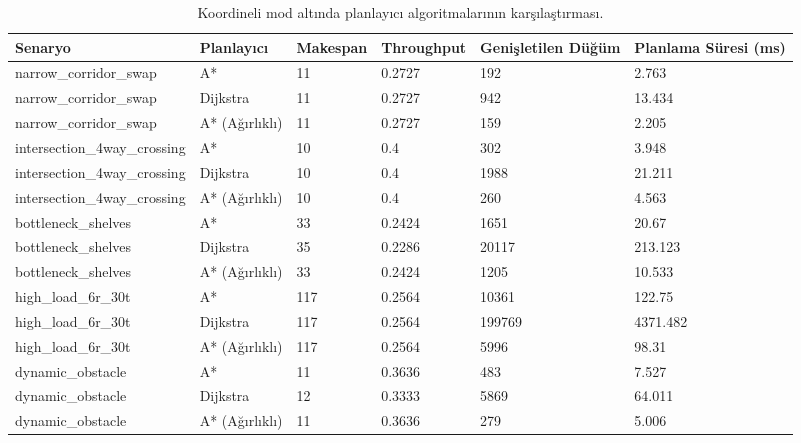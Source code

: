 \begin{table}[t]
\centering
\small
\begin{tabular}{llllll}
\hline
Senaryo & Planlayıcı & Makespan & Throughput & Genişletilen Düğüm & Planlama Süresi (ms) \\
\hline
narrow\_corridor\_swap & A* & 11 & 0.2727 & 192 & 2.763 \\
narrow\_corridor\_swap & Dijkstra & 11 & 0.2727 & 942 & 13.434 \\
narrow\_corridor\_swap & A* (Ağırlıklı) & 11 & 0.2727 & 159 & 2.205 \\
intersection\_4way\_crossing & A* & 10 & 0.4 & 302 & 3.948 \\
intersection\_4way\_crossing & Dijkstra & 10 & 0.4 & 1988 & 21.211 \\
intersection\_4way\_crossing & A* (Ağırlıklı) & 10 & 0.4 & 260 & 4.563 \\
bottleneck\_shelves & A* & 33 & 0.2424 & 1651 & 20.67 \\
bottleneck\_shelves & Dijkstra & 35 & 0.2286 & 20117 & 213.123 \\
bottleneck\_shelves & A* (Ağırlıklı) & 33 & 0.2424 & 1205 & 10.533 \\
high\_load\_6r\_30t & A* & 117 & 0.2564 & 10361 & 122.75 \\
high\_load\_6r\_30t & Dijkstra & 117 & 0.2564 & 199769 & 4371.482 \\
high\_load\_6r\_30t & A* (Ağırlıklı) & 117 & 0.2564 & 5996 & 98.31 \\
dynamic\_obstacle & A* & 11 & 0.3636 & 483 & 7.527 \\
dynamic\_obstacle & Dijkstra & 12 & 0.3333 & 5869 & 64.011 \\
dynamic\_obstacle & A* (Ağırlıklı) & 11 & 0.3636 & 279 & 5.006 \\
\hline
\end{tabular}
\caption{Koordineli mod altında planlayıcı algoritmalarının karşılaştırması.}
\label{tab:planner_ablation}
\end{table}
